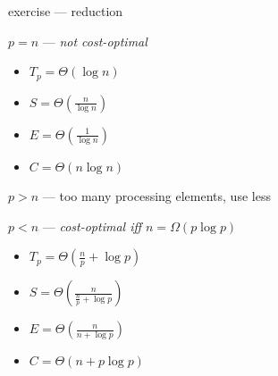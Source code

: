 \documentclass[10pt, t]{beamer}
\begin{document}
  \begin{frame}{exercise --- reduction}
    \addtocounter{framenumber}{-1}
    $p=n$ --- \emph{not cost-optimal}
    \begin{itemize}
      \item $T_p=\Theta(\log n)$
      \item $S=\Theta(\frac{n}{\log n})$
      \item $E=\Theta(\frac{1}{\log n})$
      \item $C=\Theta(n\log n)$
    \end{itemize}

    $p>n$ --- too many processing elements, use less

    $p<n$ --- \emph{cost-optimal iff $n=\Omega(p\log p)$}
    \begin{itemize}
      \item $T_p=\Theta(\frac{n}{p}+\log p)$
      \item $S=\Theta(\frac{n}{\frac{n}{p}+\log p})$
      \item $E=\Theta(\frac{n}{n+\log p})$
      \item $C=\Theta(n+p\log p)$
    \end{itemize}
  \end{frame}


\end{document}
